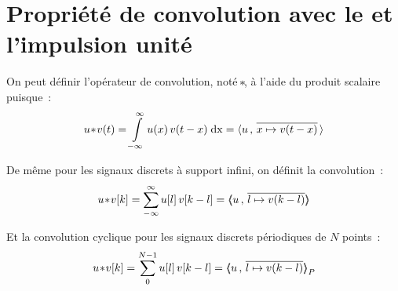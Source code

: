 \section{Propriété de convolution avec le \Dirac{} et l'impulsion unité}

On peut définir l'opérateur de convolution, noté $\!\ast\!$, à l'aide du
produit scalaire puisque~:
\begin{equation}
  \label{eq:convolution}
  u\!\ast\! v(t) = \int\limits_{-\infty}^{\infty}{u(x)\,v(t-x)\;\mathrm{d{x}}} = \langle u\,,\,\overline{x\mapsto v(t-x)}\,\rangle
\end{equation}

De même pour les signaux discrets à support infini, on définit la
convolution~:
\begin{equation}
  u\!\ast\! v[k] = \sum\limits_{-\infty}^{\infty}{u[l]\,v[k-l]} = \langle\!\!\langle u\,,\,\overline{l\mapsto v(k-l)}\rangle\!\!\rangle
\end{equation}

Et la convolution cyclique pour les signaux discrets périodiques de
$N$ points~:
\begin{equation}
  u\!\ast\! v[k] = \sum\limits_{0}^{N-1}{u[l]\,v[k-l]} = \langle\!\!\langle u\,,\,\overline{l\mapsto v(k-l)}{\rangle\!\!\rangle}_P
\end{equation}


